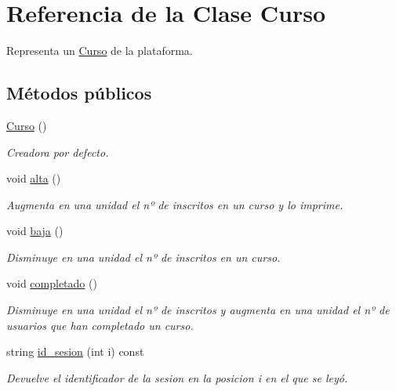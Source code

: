 \hypertarget{class_curso}{}\section{Referencia de la Clase Curso}
\label{class_curso}


Representa un \mbox{\hyperlink{class_curso}{Curso}} de la plataforma.  


\subsection*{Métodos públicos}
\begin{DoxyCompactItemize}
\item 
\mbox{\hyperlink{class_curso_add3bcc7fd065fa02b8fad76cedcc3a8a}{Curso}} ()
\begin{DoxyCompactList}\small\item\em Creadora por defecto. \end{DoxyCompactList}\item 
void \mbox{\hyperlink{class_curso_a70a7c89d56e2cfea52079990808c57c3}{alta}} ()
\begin{DoxyCompactList}\small\item\em Augmenta en una unidad el nº de inscritos en un curso y lo imprime. \end{DoxyCompactList}\item 
void \mbox{\hyperlink{class_curso_a446950b19d03260dacc9f7d5f8e98f21}{baja}} ()
\begin{DoxyCompactList}\small\item\em Disminuye en una unidad el nº de inscritos en un curso. \end{DoxyCompactList}\item 
void \mbox{\hyperlink{class_curso_a832e6ccf726c8534162079e9a041aac9}{completado}} ()
\begin{DoxyCompactList}\small\item\em Disminuye en una unidad el nº de inscritos y augmenta en una unidad el nº de usuarios que han completado un curso. \end{DoxyCompactList}\item 
string \mbox{\hyperlink{class_curso_a176168f881b166e33fa7f8f3abd1d589}{id\+\_\+sesion}} (int i) const
\begin{DoxyCompactList}\small\item\em Devuelve el identificador de la sesion en la posicion i en el que se leyó. \end{DoxyCompactList}\item 

\end{DoxyCompactItemize}
